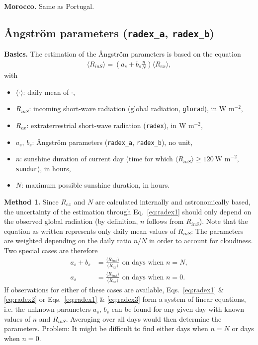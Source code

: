 \documentclass{scrreprt}
\newenvironment{denseitem}{
  \begin{itemize}
    \setlength{\itemsep}{0pt}
    \setlength{\parskip}{0pt}
    \setlength{\parsep}{0pt}
}{
  \end{itemize}
}
\begin{document}
\textbf{Morocco.}
Same as Portugal.

\subsection{{\AA}ngstr\"om parameters (\texttt{radex\_a}, \texttt{radex\_b})} \label{ssec:parest_rad_radex}

\textbf{Basics.}
The estimation of the {\AA}ngstr\"om parameters is based on the equation
\begin{align} \label{eq:radex1}
  \langle R_{inS} \rangle = \left (  a_s + b_s \frac{n}{N} \right ) \langle R_{ex} \rangle,
\end{align}
%
with
\begin{denseitem}
  \item[] $\langle \cdot \rangle$: daily mean of $\cdot$,
  \item[] $R_{inS}$: incoming short-wave radiation (global radiation, \verb!glorad!), in W m$^{-2}$,
  \item[] $R_{ex}$: extraterrestrial short-wave radiation (\verb!radex!), in W m$^{-2}$,
  \item[] $a_s$, $b_s$: {\AA}ngstr\"om parameters (\verb!radex_a!, \verb!radex_b!), no unit,
  \item[] $n$: sunshine duration of current day (time for which $\langle R_{inS} \rangle \geq 120~\text{W~m}^{-2}$, \verb!sundur!), in hours,
  \item[] $N$: maximum possible sunshine duration, in hours.
\end{denseitem}

\textbf{Method 1.}
Since $R_{ex}$ and $N$ are calculated internally and astronomically based, the uncertainty of the estimation through Eq.~\eqref{eq:radex1} should only depend on the observed global radiation (by definition, $n$ follows from $R_{inS}$).
Note that the equation as written represents only daily mean values of $R_{inS}$:
The parameters are weighted depending on the daily ratio $n/N$ in order to account for cloudiness.
Two special cases are therefore
\begin{align}
  a_s + b_s &= \frac{\langle R_{inS} \rangle}{\langle R_{ex} \rangle} \text{ on days when } n=N, \label{eq:radex2} \\
  a_s &= \frac{\langle R_{inS} \rangle}{\langle R_{ex} \rangle} \text{ on days when } n=0. \label{eq:radex3}
\end{align}
%
If observations for either of these cases are available, Eqs.~\eqref{eq:radex1} \& \eqref{eq:radex2} or Eqs.~\eqref{eq:radex1} \& \eqref{eq:radex3} form a system of linear equations, i.e. the unknown parameters $a_s$, $b_s$ can be found for any given day with known values of $n$ and $R_{inS}$.
Averaging over all days would then determine the parameters.
Problem: It might be difficult to find either days when $n=N$ or days when $n=0$.
\end{document}
